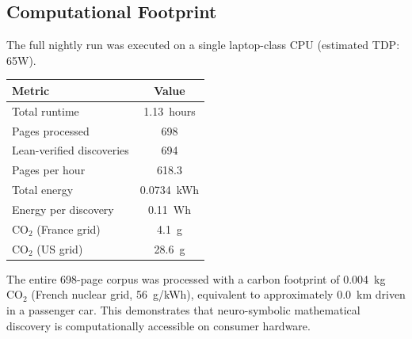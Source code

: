 \subsection{Computational Footprint}
\label{subsec:green_it}

The full \RAMA{} nightly run was executed on a single laptop-class CPU (estimated TDP: 65W).

\begin{center}
\begin{tabular}{lc}
\toprule
\textbf{Metric} & \textbf{Value} \\
\midrule
Total runtime & 1.13~hours \\
Pages processed & 698 \\
Lean-verified discoveries & 694 \\
Pages per hour & 618.3 \\
Total energy & 0.0734~kWh \\
Energy per discovery & 0.11~Wh \\
CO$_2$ (France grid) & 4.1~g \\
CO$_2$ (US grid) & 28.6~g \\
\bottomrule
\end{tabular}
\end{center}

The entire 698-page corpus was processed with a carbon footprint of 0.004~kg CO$_2$ (French nuclear grid, 56~g/kWh), equivalent to approximately 0.0~km driven in a passenger car. This demonstrates that neuro-symbolic mathematical discovery is computationally accessible on consumer hardware.
